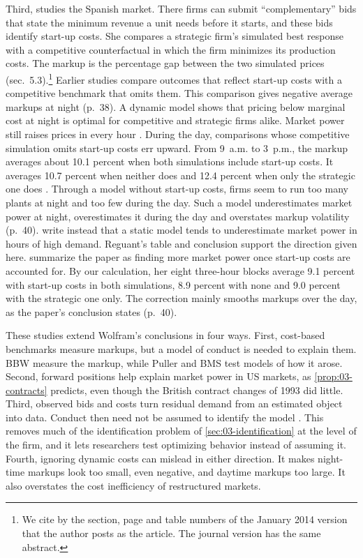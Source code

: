 Third, \citet{Reguant2014} studies the Spanish market. There firms can submit ``complementary'' bids that state the
minimum revenue a unit needs before it starts, and these bids identify start-up costs. She compares a strategic firm's
simulated best response with a competitive counterfactual in which the firm minimizes its production costs. The
markup is the percentage gap between the two simulated prices (sec.~5.3).\footnote{We cite \citet{Reguant2014} by the
section, page and table numbers of the January 2014 version that the author posts as the article. The journal version
has the same abstract.} Earlier studies compare outcomes that reflect start-up costs with a
competitive benchmark that omits them. This comparison gives negative average markups at night (p.~38). A dynamic
model shows that pricing below marginal cost at night is optimal for competitive and strategic firms alike. Market
power still raises prices in every hour \citep[pp.~699--700]{KelloggReguant2021}. During the day, comparisons whose competitive simulation omits start-up
costs err upward. From 9~a.m. to 3~p.m., the markup averages about 10.1 percent when both simulations include
start-up costs. It averages 10.7 percent when neither does and 12.4 percent when only the strategic one does
\citep[Table~5]{Reguant2014}. Through a model without start-up costs, firms seem to run too many plants at night and too few during the
day. Such a model underestimates market power at night, overestimates it during the day and overstates markup
volatility (p.~40). \citet[p.~700]{KelloggReguant2021} write instead that a static model tends to underestimate market
power in hours of high demand. Reguant's table and conclusion support the direction given here.
\citet[p.~147]{HortacsuPerrigne2021} summarize the paper as finding more market power once start-up costs are
accounted for. By our calculation, her eight three-hour blocks average 9.1 percent with start-up costs in both
simulations, 8.9 percent with none and 9.0 percent with the strategic one only. The correction
mainly smooths markups over the day, as the paper's conclusion states (p.~40).

These studies extend Wolfram's conclusions in four ways. First, cost-based benchmarks measure markups, but a model of
conduct is needed to explain them. BBW measure the markup, while Puller and BMS test models of how it arose. Second,
forward positions help explain market power in US markets, as \cref{prop:03-contracts} predicts, even though the
British contract changes of 1993 did little. Third, observed bids and costs turn residual demand from an estimated
object into data. Conduct then need not be assumed to identify the model \citep[p.~696]{KelloggReguant2021}. This
removes much of the identification problem of \cref{sec:03-identification} at the level of the firm, and it lets
researchers test optimizing behavior instead of assuming it. Fourth, ignoring dynamic
costs can mislead in either direction. It makes night-time markups look too small, even negative, and daytime
markups too large. It also overstates the cost inefficiency of restructured markets.

